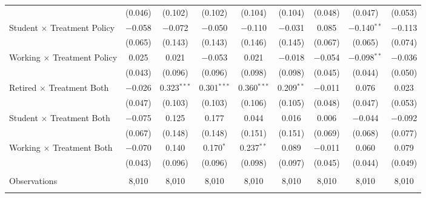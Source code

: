 \begin{tabular}{@{\extracolsep{5pt}}lcccccccc}
  & (0.046) & (0.102) & (0.102) & (0.104) & (0.104) & (0.048) & (0.047) & (0.053) \\ 
 Student $\times$ Treatment Policy & $-$0.058 & $-$0.072 & $-$0.050 & $-$0.110 & $-$0.031 & 0.085 & $-$0.140$^{**}$ & $-$0.113 \\ 
  & (0.065) & (0.143) & (0.143) & (0.146) & (0.145) & (0.067) & (0.065) & (0.074) \\ 
 Working $\times$ Treatment Policy & 0.025 & 0.021 & $-$0.053 & 0.021 & $-$0.018 & $-$0.054 & $-$0.098$^{**}$ & $-$0.036 \\ 
  & (0.043) & (0.096) & (0.096) & (0.098) & (0.098) & (0.045) & (0.044) & (0.050) \\ 
 Retired $\times$ Treatment Both & $-$0.026 & 0.323$^{***}$ & 0.301$^{***}$ & 0.360$^{***}$ & 0.209$^{**}$ & $-$0.011 & 0.076 & 0.023 \\ 
  & (0.047) & (0.103) & (0.103) & (0.106) & (0.105) & (0.048) & (0.047) & (0.053) \\ 
 Student $\times$ Treatment Both & $-$0.075 & 0.125 & 0.177 & 0.044 & 0.016 & 0.006 & $-$0.044 & $-$0.092 \\ 
  & (0.067) & (0.148) & (0.148) & (0.151) & (0.151) & (0.069) & (0.068) & (0.077) \\ 
 Working $\times$ Treatment Both & $-$0.070 & 0.140 & 0.170$^{*}$ & 0.237$^{**}$ & 0.089 & $-$0.011 & 0.060 & 0.079 \\ 
  & (0.043) & (0.096) & (0.096) & (0.098) & (0.097) & (0.045) & (0.044) & (0.049) \\ 
\hline \\[-1.8ex] 

Observations & 8,010 & 8,010 & 8,010 & 8,010 & 8,010 & 8,010 & 8,010 & 8,010 \\ 
\hline 
\hline \\[-1.8ex] 
\end{tabular} 